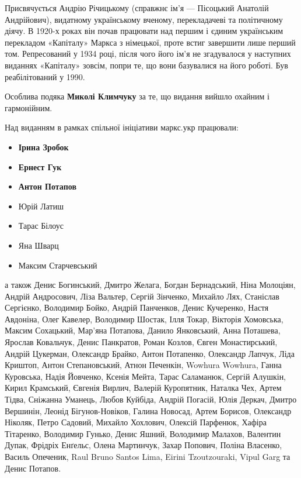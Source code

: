 
Присвячується Андрію Річицькому (справжнє ім'я — Пісоцький Анатолій Андрійович), видатному українському вченому, перекладачеві та політичному діячу. В 1920-х роках він почав працювати над першим і єдиним українським перекладом «Капіталу» Маркса з німецької, проте встиг завершити лише перший том. Репресований у 1934 році, після чого його ім’я не згадувалося у наступних виданнях «Капіталу» зовсім, попри те, що вони базувалися на його роботі. Був реабілітований у 1990. 


\noindent{}Особлива подяка \textbf{Миколі Климчуку} за те,
що видання вийшло охайним і гармонійним. 

\smallskip
\noindent{}Над виданням в рамках спільної ініціативи маркс.укр працювали:
\begin{itemize}[nosep]
\item \textbf{Ірина Зробок}
\item \textbf{Ернест Гук}
\item \textbf{Антон Потапов}
\item Юрій Латиш
\item Тарас Білоус
\item Яна Шварц
\item Максим Старчевський
\end{itemize}
\noindent{}а також
Денис Богинський,
Дмитро Желага,
Богдан Бернадський,
Ніна Молоціян,
Андрій Андросович,
Ліза Вальтер,
Сергій Зінченко,
Михайло Лях,
Станіслав Сергієнко,
Володимир Бойко,
Андрій Панченков,
Денис Кучеренко,
Настя Авдоніна,
Олег Кавелер,
Володимир Шостак,
Ілля Токар,
Вікторія Хомовська,
Максим Сохацький,
Мар'яна Потапова,
Данило Янковський,
Анна Поташева,
Ярослав Ковальчук,
Денис Панкратов,
Роман Козлов,
Євген Монастирський,
Андрій Цукерман,
Олександр Брайко,
Антон Потапенко,
Олександр Лапчук,
Ліда Криштоп,
Антон Степановський,
Атнон Печенкін,
Wowhura Wowhura,
Ганна Куровська,
Надія Йовченко,
Ксенія Мейта,
Тарас Саламанюк,
Сергій Алушкін,
Кирил Крамський,
Євгенія Вирлич,
Валерій Куропятник,
Наталка Чех,
Артем Тідва,
Сніжанна Уманець,
Любов Куйбіда,
Андрій Погасій,
Юлія Деркач,
Дмитро Вершинін,
Леонід Бігунов-Новіков,
Галина Новосад,
Артем Борисов,
Олександр Ніколяк,
Петро Садовий,
Михайло Хохлович,
Олексій Парфенюк,
Хафіра Тітаренко,
Володимир Гунько,
Денис Яшний,
Володимир Малахов,
Валентин Дупак,
Фрідріх Енґельс,
Олена Мартинчук,
Захар Попович,
Поліна Власенко,
Василь Опеченик,
Raul Bruno Santos Lima,
Eirini Tzoutzouraki,
Vipul Garg
та Денис Потапов.

\cleardoublepage
